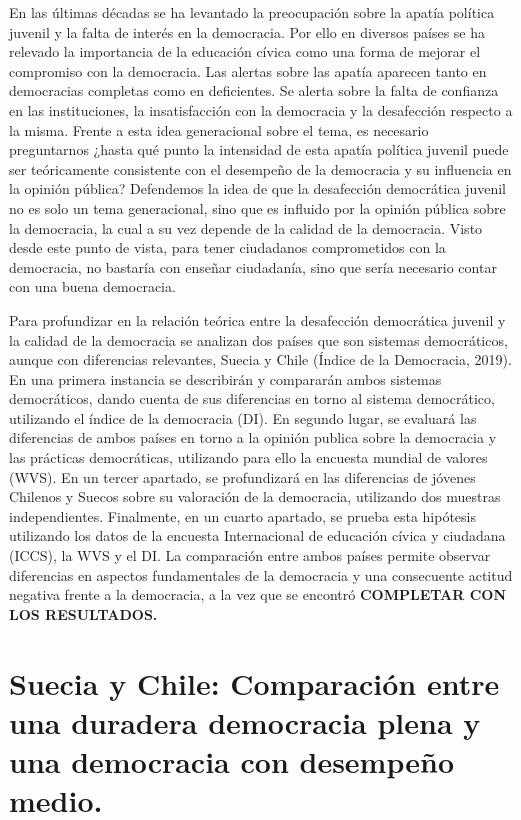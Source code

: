 \documentclass[12pt,twoside]{templates/facsothesis}
\begin{document}
En las últimas décadas se ha levantado la preocupación sobre la apatía política juvenil y la falta de interés en la democracia. Por ello en diversos países se ha relevado la importancia de la educación cívica como una forma de mejorar el compromiso con la democracia. Las alertas sobre las apatía aparecen tanto en democracias completas como en deficientes. Se alerta sobre la falta de confianza en las instituciones, la insatisfacción con la democracia y la desafección respecto a la misma. Frente a esta idea generacional sobre el tema, es necesario preguntarnos ¿hasta qué punto la intensidad de esta apatía política juvenil puede ser teóricamente consistente con el desempeño de la democracia y su influencia en la opinión pública? Defendemos la idea de que la desafección democrática juvenil no es solo un tema generacional, sino que es influido por la opinión pública sobre la democracia, la cual a su vez depende de la calidad de la democracia. Visto desde este punto de vista, para tener ciudadanos comprometidos con la democracia, no bastaría con enseñar ciudadanía, sino que sería necesario contar con una buena democracia.

Para profundizar en la relación teórica entre la desafección democrática juvenil y la calidad de la democracia se analizan dos países que son sistemas democráticos, aunque con diferencias relevantes, Suecia y Chile (Índice de la Democracia, 2019). En una primera instancia se describirán y compararán ambos sistemas democráticos, dando cuenta de sus diferencias en torno al sistema democrático, utilizando el índice de la democracia (DI). En segundo lugar, se evaluará las diferencias de ambos países en torno a la opinión publica sobre la democracia y las prácticas democráticas, utilizando para ello la encuesta mundial de valores (WVS). En un tercer apartado, se profundizará en las diferencias de jóvenes Chilenos y Suecos sobre su valoración de la democracia, utilizando dos muestras independientes. Finalmente, en un cuarto apartado, se prueba esta hipótesis utilizando los datos de la encuesta Internacional de educación cívica y ciudadana (ICCS), la WVS y el DI. La comparación entre ambos países permite observar diferencias en aspectos fundamentales de la democracia y una consecuente actitud negativa frente a la democracia, a la vez que se encontró \textbf{COMPLETAR CON LOS RESULTADOS.}

\hypertarget{suecia-y-chile-comparaciuxf3n-entre-una-duradera-democracia-plena-y-una-democracia-con-desempeuxf1o-medio.}{%
\chapter{Suecia y Chile: Comparación entre una duradera democracia plena y una democracia con desempeño medio.}\label{suecia-y-chile-comparaciuxf3n-entre-una-duradera-democracia-plena-y-una-democracia-con-desempeuxf1o-medio.}}
\end{document}
